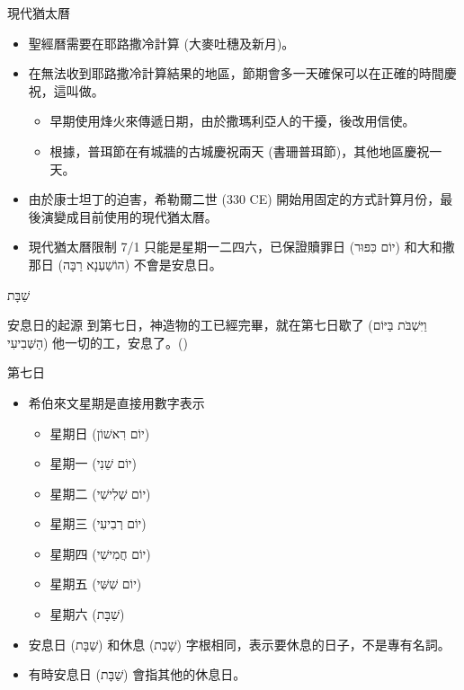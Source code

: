\documentclass{beamer}
\newcommand{\topic}[1]{
  \begin{frame}
    \centering
    \vspace*{1cm}
    {\fontsize{40}{48}\selectfont #1\par}
    \vfill
  \end{frame}
}
\newcommand{\parvspace}{\par\vspace{0.5em}}
\begin{document}
\begin{frame}{現代猶太曆}
  \begin{itemize}
    \item 聖經曆需要在耶路撒冷計算 (大麥吐穗及新月)。
    \item 在無法收到耶路撒冷計算結果的地區，節期會多一天確保可以在正確的時間慶祝，這叫做\textcite{YomTovSheni}。
      \begin{itemize}
        \item 早期使用烽火來傳遞日期，由於撒瑪利亞人的干擾，後改用信使。\parencite{HistoryOfCalendar}
        \item 根據，普珥節在有城牆的古城慶祝兩天 (書珊普珥節)，其他地區慶祝一天。
      \end{itemize}
    \item 由於康士坦丁的迫害，希勒爾二世 (330 CE) 開始用固定的方式計算月份，最後演變成目前使用的現代猶太曆。\parencite{HistoryOfCalendar}
    \item 現代猶太曆限制 7/1 只能是星期一二四六，已保證贖罪日 (\texthebrew{יוֹם כִּפּוּר}) 和大和撒那日 (\texthebrew{הוֹשַׁעְנָא רַבָּה}) 不會是安息日。\parencite{JewishCalendar}
  \end{itemize}
\end{frame}

\topic{\texthebrew{שַׁבָּת}}

\begin{frame}{安息日的起源}
  到第七日，神造物的工已經完畢，就在\alert{第七日歇了 (\texthebrew{וַיִּשְׁבֹּת בַּיּוֹם הַשְּׁבִיעִי})} 他一切的工，安息了。()\parvspace
\end{frame}

\begin{frame}{第七日}
  \begin{itemize}
    \item 希伯來文星期是直接用數字表示
      \begin{itemize}
        \item 星期日 (\texthebrew{יוֹם רִאשׁוֹן})
        \item 星期一 (\texthebrew{יוֹם שֵׁנִי})
        \item 星期二 (\texthebrew{יוֹם שְׁלִישִׁי})
        \item 星期三 (\texthebrew{יוֹם רְבִיעִי})
        \item 星期四 (\texthebrew{יוֹם חֲמִישִׁי})
        \item 星期五 (\texthebrew{יוֹם שִׁשִּׁי})
        \item 星期六 (\texthebrew{שַׁבָּת})
      \end{itemize}
    \item 安息日 (\texthebrew{שַׁבָּת}) 和休息 (\texthebrew{שָׁבַת})
      字根相同，表示要休息的日子，不是專有名詞。
    \item 有時安息日 (\texthebrew{שַׁבָּת}) 會指其他的休息日。
  \end{itemize}
\end{frame}
\end{document}
